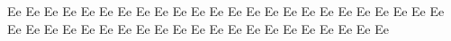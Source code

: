 \documentclass{worksheet}
\begin{document}
\begin{drillsheet}
\calligra
Ee Ee Ee Ee Ee Ee Ee Ee Ee Ee Ee Ee Ee Ee Ee Ee Ee Ee Ee Ee Ee Ee Ee Ee Ee Ee Ee Ee Ee Ee Ee Ee Ee Ee Ee Ee Ee Ee Ee Ee Ee Ee Ee Ee Ee
\end{drillsheet}
\end{document}
